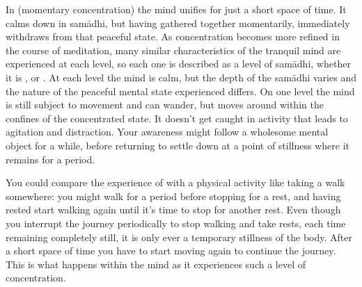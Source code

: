 In  (momentary concentration) the mind unifies for just a short space of time. It calms down in sam\=adhi, but having gathered together momentarily, immediately withdraws from that peaceful state. As concentration becomes more refined in the course of meditation, many similar characteristics of the tranquil mind are experienced at each level, so each one is described as a level of sam\=adhi, whether it is ,  or . At each level the mind is calm, but the depth of the sam\=adhi varies and the nature of the peaceful mental state experienced differs. On one level the mind is still subject to movement and can wander, but moves around within the confines of the concentrated state. It doesn't get caught in activity that leads to agitation and distraction. Your awareness might follow a wholesome mental object for a while, before returning to settle down at a point of stillness where it remains for a period.

You could compare the experience of  with a physical activity like taking a walk somewhere: you might walk for a period before stopping for a rest, and having rested start walking again until it's time to stop for another rest. Even though you interrupt the journey periodically to stop walking and take rests, each time remaining completely still, it is only ever a temporary stillness of the body. After a short space of time you have to start moving again to continue the journey. This is what happens within the mind as it experiences such a level of concentration.

